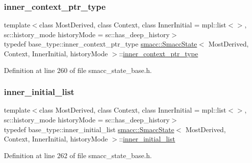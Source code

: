 \subsubsection{\texorpdfstring{inner\+\_\+context\+\_\+ptr\+\_\+type}{inner\_context\_ptr\_type}}
{\footnotesize\ttfamily template$<$class Most\+Derived, class Context, class Inner\+Initial = mpl\+::list$<$$>$, sc\+::history\+\_\+mode history\+Mode = sc\+::has\+\_\+deep\+\_\+history$>$ \\
typedef base\+\_\+type\+::inner\+\_\+context\+\_\+ptr\+\_\+type \hyperlink{classsmacc_1_1SmaccState}{smacc\+::\+Smacc\+State}$<$ Most\+Derived, Context, Inner\+Initial, history\+Mode $>$\+::\hyperlink{classsmacc_1_1SmaccState_a65a772c2e2039e9a59148ba6ffb54d8a}{inner\+\_\+context\+\_\+ptr\+\_\+type}}



Definition at line 260 of file smacc\+\_\+state\+\_\+base.\+h.

\mbox{\label{classsmacc_1_1SmaccState_acb4ac84bce421d39b594510a6b2df558}} 
\subsubsection{\texorpdfstring{inner\+\_\+initial\+\_\+list}{inner\_initial\_list}}
{\footnotesize\ttfamily template$<$class Most\+Derived, class Context, class Inner\+Initial = mpl\+::list$<$$>$, sc\+::history\+\_\+mode history\+Mode = sc\+::has\+\_\+deep\+\_\+history$>$ \\
typedef base\+\_\+type\+::inner\+\_\+initial\+\_\+list \hyperlink{classsmacc_1_1SmaccState}{smacc\+::\+Smacc\+State}$<$ Most\+Derived, Context, Inner\+Initial, history\+Mode $>$\+::\hyperlink{classsmacc_1_1SmaccState_acb4ac84bce421d39b594510a6b2df558}{inner\+\_\+initial\+\_\+list}}



Definition at line 262 of file smacc\+\_\+state\+\_\+base.\+h.

\mbox{\label{classsmacc_1_1SmaccState_a60088405d2d99d468caa0baa3b2830a8}} 
